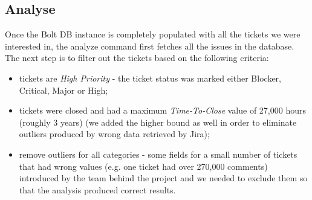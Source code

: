 \documentclass{mpaper}
\begin{document}
\subsection{Analyse}

Once the Bolt DB instance is completely populated with all the tickets we were interested in, the analyze command first 
fetches all the issues in the database. The next step is to filter out the tickets based on the following criteria:
\begin{itemize}
  \item tickets are \emph{High Priority} - the ticket status was marked either Blocker, Critical, Major or High;
  \item tickets were closed and had a maximum \emph{Time-To-Close} value of 27,000 hours (roughly 3 years) (we added the 
  higher bound as well in order to eliminate outliers produced by wrong data retrieved by Jira);
  \item remove outliers for all categories - some fields for a small number of tickets that had wrong values (e.g. one ticket
  had over 270,000 comments) introduced by the team behind the project and we needed to exclude them so that the analysis 
  produced correct results.
\end{itemize}
\end{document}
